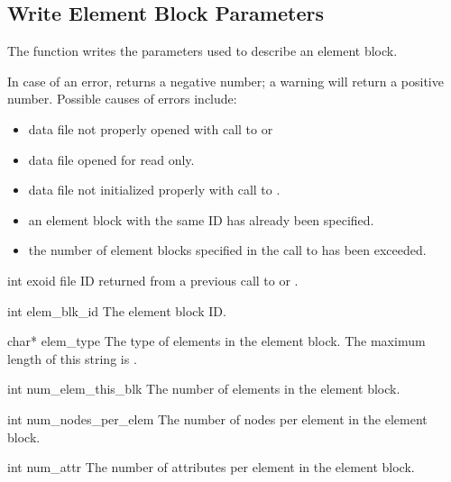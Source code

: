 \subsection{Write Element Block Parameters}\label{s:pebparam}

The function  writes the parameters used
to describe an element block.

In case of an error,  returns a negative
number; a warning will return a positive number. Possible causes of
errors include:

\begin{itemize}
 \item data file not properly opened with call to 
 or 

 \item data file opened for read only.

 \item data file not initialized properly with call to
 .

 \item an element block with the same ID has already been specified.

 \item the number of element blocks specified in the call to
  has been exceeded.
\end{itemize}


\begin{parameters}
\item[{int exoid \R{}}]
\exo{} file ID returned from a previous call to 
or .

\item[{int elem_blk_id \R{}}]
The element block ID.

\item[{char* elem_type \R{}}]
The type of elements in the element block. The maximum length of this
string is .

\item[{int num_elem_this_blk \R{}}]
The number of elements in the element block.

\item[{int num_nodes_per_elem \R{}}]
The number of nodes per element in the element block.

\item[{int num_attr \R{}}]
The number of attributes per element in the element block.
\end{parameters}

